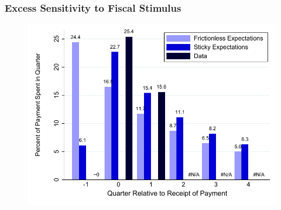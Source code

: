 \documentclass{beamer}\usepackage{dcolumn}
\begin{document}
\begin{frame}
\frametitle{Excess Sensitivity to Fiscal Stimulus}
  \begin{figure}
	\begin{center}
		\includegraphics[width=.9\textwidth]{../Figures/parkerExperiment}
	\end{center}
\end{figure}
\end{frame}
\end{document}

